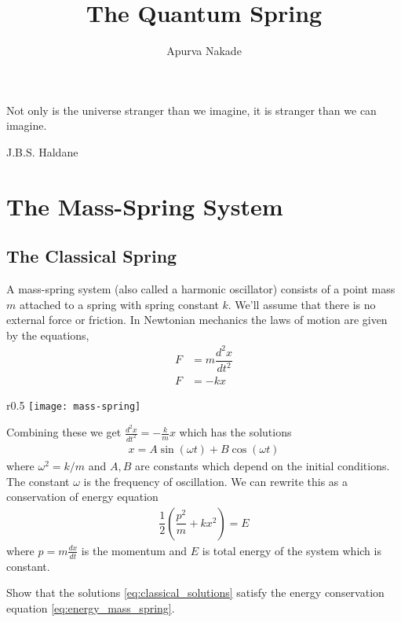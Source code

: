
\usepackage{wrapfig}
\usepackage[makeroom]{cancel}

\title{The Quantum Spring}
\author{\small{Apurva Nakade}}
\date{}

\maketitle
\vspace{-2em}
\epigraph{Not only is the universe stranger than we imagine, it is stranger than we can imagine.}{J.B.S. Haldane}
\vspace{-2em}
\tableofcontents

\section{The Mass-Spring System}
\subsection{The Classical Spring}
A mass-spring system (also called a harmonic oscillator) consists of a point mass $m$ attached to a spring with spring constant $k$. We'll assume that there is no external force or friction. In Newtonian mechanics the laws of motion are given by the equations,
\begin{align*}
	F &= m \dfrac{d^2 x }{dt^2}\\
	F &= -kx
\end{align*}
\begin{wrapfigure}{r}{0.5\textwidth}
		\centering
		\texttt{[image: mass-spring]}
	\end{wrapfigure}
Combining these we get $\frac {d^2 x }{dt^2} = -\frac{k}{m}x$ which has the solutions
\begin{align}
	\label{eq:classical_solutions}
	x = A \sin (\omega t) + B \cos(\omega t)
\end{align}
where $\omega^2=k/m$ and $A, B$ are constants which depend on the initial conditions. The constant $\omega$ is the frequency of oscillation. We can rewrite this as a conservation of energy equation
\begin{align}
	\label{eq:energy_mass_spring}
	\dfrac{1}{2} \left(\dfrac{p^2}{m} + k x^2\right) = E
\end{align}
where $p = m \frac{dx}{dt}$ is the momentum and $E$ is total energy of the system which is constant.

\begin{ques}
	Show that the solutions \eqref{eq:classical_solutions} satisfy the energy conservation equation \eqref{eq:energy_mass_spring}.
\end{ques}


